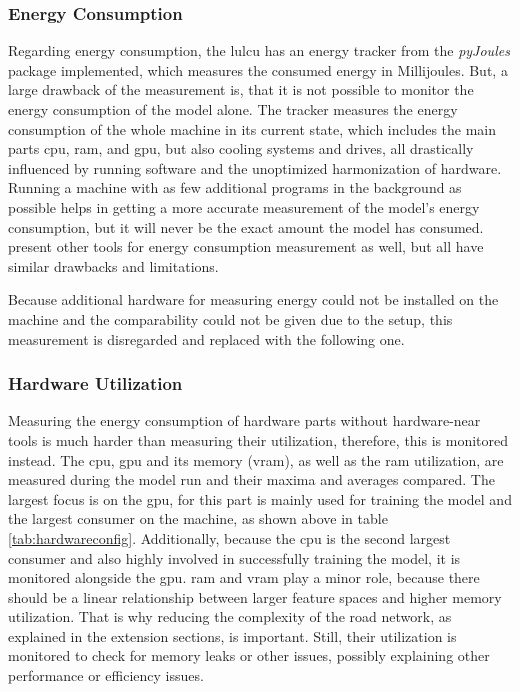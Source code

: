 \subsubsection*{Energy Consumption}

Regarding energy consumption, the \gls{lulcu} has an energy tracker from the \emph{pyJoules} package \autocite{PowerAPI2024} implemented, which measures the consumed energy in Millijoules. But, a large drawback of the measurement is, that it is not possible to monitor the energy consumption of the model alone. The tracker measures the energy consumption of the whole machine in its current state, which includes the main parts \gls{cpu}, \gls{ram}, and \gls{gpu}, but also cooling systems and drives, all drastically influenced by running software and the unoptimized harmonization of hardware. Running a machine with as few additional programs in the background as possible helps in getting a more accurate measurement of the model's energy consumption, but it will never be the exact amount the model has consumed. \textcite{Li.Jiang.ea2021,Mehlin.Schacht.ea2023} present other tools for energy consumption measurement as well, but all have similar drawbacks and limitations.

Because additional hardware for measuring energy could not be installed on the machine and the comparability could not be given due to the setup, this measurement is disregarded and replaced with the following one.

\subsubsection*{Hardware Utilization}

Measuring the energy consumption of hardware parts without hardware-near tools is much harder than measuring their utilization, therefore, this is monitored instead. The \gls{cpu}, \gls{gpu} and its memory (\gls{vram}), as well as the \gls{ram} utilization, are measured during the model run and their maxima and averages compared. The largest focus is on the \gls{gpu}, for this part is mainly used for training the model and the largest consumer on the machine, as shown above in table \ref{tab:hardwareconfig}. Additionally, because the \gls{cpu} is the second largest consumer and also highly involved in successfully training the model, it is monitored alongside the \gls{gpu}. \gls{ram} and \gls{vram} play a minor role, because there should be a linear relationship between larger feature spaces and higher memory utilization. That is why reducing the complexity of the road network, as explained in the extension sections, is important. Still, their utilization is monitored to check for memory leaks or other issues, possibly explaining other performance or efficiency issues. 

